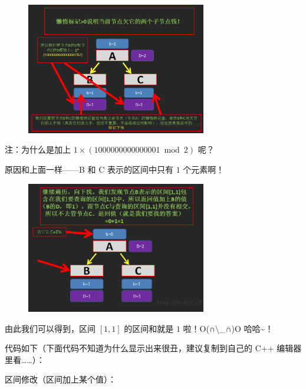 \begin{figure}[htbp]
\centering
\includegraphics[width=0.7\textwidth]{docs/ds/images/segt14.png} 

\end{figure}

注：为什么是加上 $1\times (1000000000000001\bmod 2)$ 呢？

原因和上面一样——B 和 C 表示的区间中只有 $1$ 个元素啊！

\begin{figure}[htbp]
\centering
\includegraphics[width=0.7\textwidth]{docs/ds/images/segt15.png} 

\end{figure}

由此我们可以得到，区间 $[1,1]$ 的区间和就是 $1$ 啦！O(∩\textbackslash{}\_∩)O 哈哈\textasciitilde{}！

代码如下（下面代码不知道为什么显示出来很丑，建议复制到自己的 C++ 编辑器里看……）：

区间修改（区间加上某个值）：


